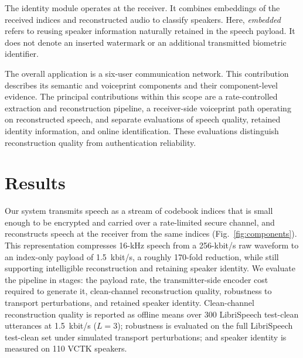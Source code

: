 \documentclass[final,5p,times,twocolumn]{elsarticle}
\begin{document}
The identity module operates at the receiver. It combines embeddings of the received indices and reconstructed audio to classify speakers. Here, \emph{embedded} refers to reusing speaker information naturally retained in the speech payload. It does not denote an inserted watermark or an additional transmitted biometric identifier.

The overall application is a six-user communication network. This contribution describes its semantic and voiceprint components and their component-level evidence. The principal contributions within this scope are a rate-controlled extraction and reconstruction pipeline, a receiver-side voiceprint path operating on reconstructed speech, and separate evaluations of speech quality, retained identity information, and online identification. These evaluations distinguish reconstruction quality from authentication reliability.

\section{Results}
Our system transmits speech as a stream of codebook indices that is small enough to be encrypted and carried over a rate-limited secure channel, and reconstructs speech at the receiver from the same indices (Fig.~\ref{fig:components}). This representation compresses 16-kHz speech from a 256-kbit/s raw waveform to an index-only payload of 1.5~kbit/s, a roughly 170-fold reduction, while still supporting intelligible reconstruction and retaining speaker identity. We evaluate the pipeline in stages: the payload rate, the transmitter-side encoder cost required to generate it, clean-channel reconstruction quality, robustness to transport perturbations, and retained speaker identity. Clean-channel reconstruction quality is reported as offline means over 300 LibriSpeech test-clean utterances at 1.5~kbit/s ($L=3$); robustness is evaluated on the full LibriSpeech test-clean set under simulated transport perturbations; and speaker identity is measured on 110 VCTK speakers.
\end{document}
